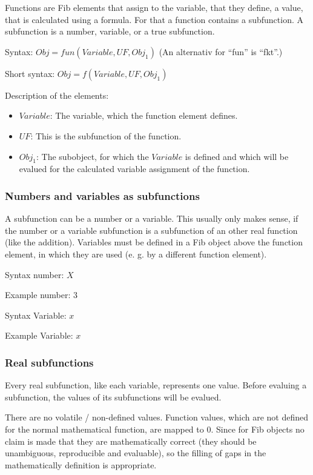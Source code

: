 Functions are Fib elements that assign to the variable, that they define, a value, that is calculated using a formula.
For that a function contains a subfunction. A subfunction is a number, variable, or a true subfunction.

\bigskip\noindent
Syntax:
$Obj = fun( Variable ,UF ,Obj_1 )$
(An alternativ for  ``fun'' is ``fkt''.)

\bigskip\noindent
Short syntax:
$Obj = f( Variable ,UF ,Obj_1 )$

\bigskip\noindent
Description of the elements:
\begin{itemize}
 \item $Variable$: The variable, which the function element defines.
 \item $UF$: This is the subfunction of the function.
 \item $Obj_1$: The subobject, for which the $Variable$ is defined and which will be evalued for the calculated variable assignment of the function.
\end{itemize}


\subsubsection{Numbers and variables as subfunctions}
\label{fibUnderFunctionValueVariable}

A subfunction can be a number or a variable. This usually only makes sense, if the number or a variable subfunction is a subfunction of an other real function (like the addition).
Variables must be defined in a Fib object above the function element, in which they are used (e. g. by a different function element).

\bigskip\noindent
Syntax number:
$X$

\bigskip\noindent
Example number:
$3$

\bigskip\noindent
Syntax Variable:
$x$

\bigskip\noindent
Example Variable:
$x$


\subsubsection{Real subfunctions}
\label{fibUnderFunction}

Every real subfunction, like each variable, represents one value. Before evaluing a subfunction, the values of its subfunctions will be evalued.

There are no volatile / non-defined values. Function values, which are not defined for the normal mathematical function, are mapped to $0$. Since for Fib objects no claim is made that they are mathematically correct (they should be unambiguous, reproducible and evaluable), so the filling of gaps in the mathematically definition is appropriate.


